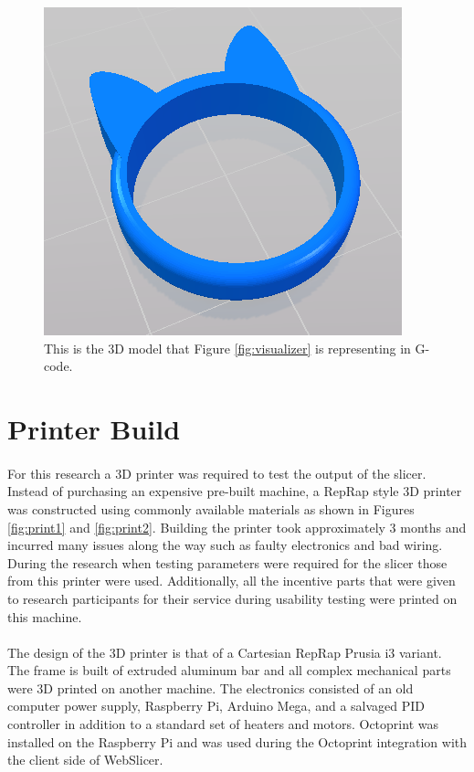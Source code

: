 \begin{figure}[!ht]
  \centering
  \includegraphics[width=\linewidth]{images/cat-ring.png}
  \caption{This is the 3D model that Figure \ref{fig:visualizer} is representing in G-code.}
  \label{fig:cat-ring}
\end{figure}

\section{Printer Build}
\paragraph{}
For this research a 3D printer was required to test the output of the slicer.
Instead of purchasing an expensive pre-built machine, a RepRap style 3D printer was constructed using commonly available materials as shown in Figures \ref{fig:print1} and \ref{fig:print2}.
Building the printer took approximately 3 months and incurred many issues along the way such as faulty electronics and bad wiring.
During the research when testing parameters were required for the slicer those from this printer were used.
Additionally, all the incentive parts that were given to research participants for their service during usability testing were printed on this machine.

\paragraph{}
The design of the 3D printer is that of a Cartesian RepRap Prusia i3 variant.
The frame is built of extruded aluminum bar and all complex mechanical parts were 3D printed on another machine.
The electronics consisted of an old computer power supply, Raspberry Pi, Arduino Mega, and a salvaged PID controller in addition to a standard set of heaters and motors.
Octoprint was installed on the Raspberry Pi and was used during the Octoprint integration with the client side of WebSlicer.

